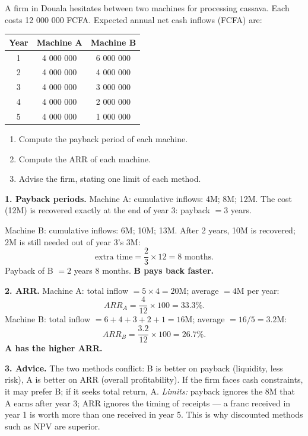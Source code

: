 \documentclass[11pt]{article}
\begin{document}
\begin{exoresolu}
A firm in Douala hesitates between two machines for processing cassava. Each costs 12 000 000 FCFA. Expected annual net cash inflows (FCFA) are:

\begin{center}
\begin{tabular}{|c|c|c|}
\hline
\rowcolor{popblueL} Year & Machine A & Machine B \\
\hline
1 & 4 000 000 & 6 000 000 \\
\hline
2 & 4 000 000 & 4 000 000 \\
\hline
3 & 4 000 000 & 3 000 000 \\
\hline
4 & 4 000 000 & 2 000 000 \\
\hline
5 & 4 000 000 & 1 000 000 \\
\hline
\end{tabular}
\end{center}

\begin{enumerate}
\item Compute the payback period of each machine.
\item Compute the ARR of each machine.
\item Advise the firm, stating one limit of each method.
\end{enumerate}
\tcblower
\textbf{1. Payback periods.}
Machine A: cumulative inflows: 4M; 8M; 12M. The cost (12M) is recovered exactly at the end of year 3: payback $= 3$ years.

Machine B: cumulative inflows: 6M; 10M; 13M. After 2 years, 10M is recovered; 2M is still needed out of year 3's 3M:
\[ \text{extra time} = \frac{2}{3} \times 12 = 8 \text{ months}. \]
Payback of B $= 2$ years 8 months. \textbf{B pays back faster.}

\textbf{2. ARR.}
Machine A: total inflow $= 5 \times 4 = 20$M; average $= 4$M per year:
\[ ARR_A = \frac{4}{12} \times 100 = 33.3\%. \]
Machine B: total inflow $= 6+4+3+2+1 = 16$M; average $= 16/5 = 3.2$M:
\[ ARR_B = \frac{3.2}{12} \times 100 = 26.7\%. \]
\textbf{A has the higher ARR.}

\textbf{3. Advice.} The two methods conflict: B is better on payback (liquidity, less risk), A is better on ARR (overall profitability). If the firm faces cash constraints, it may prefer B; if it seeks total return, A. \emph{Limits:} payback ignores the 8M that A earns after year 3; ARR ignores the timing of receipts — a franc received in year 1 is worth more than one received in year 5. This is why discounted methods such as NPV are superior.
\end{exoresolu}
\end{document}
